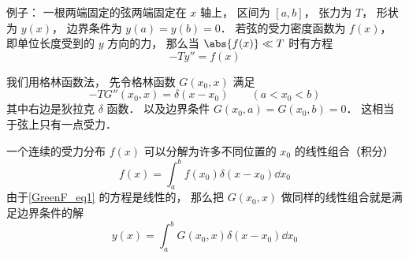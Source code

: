 
\begin{issues}
\issueDraft
\end{issues}


例子： 一根两端固定的弦两端固定在 $x$ 轴上， 区间为 $[a, b]$， 张力为 $T$， 形状为 $y(x)$， 边界条件为 $y(a) = y(b) = 0$． 若弦的受力密度函数为 $f(x)$， 即单位长度受到的 $y$ 方向的力， 那么当 $\abs{f(x)} \ll T$ 时有方程
\begin{equation}\label{GreenF_eq1}
-T y'' = f(x)
\end{equation}

我们用格林函数法， 先令格林函数 $G(x_0, x)$ 满足
\begin{equation}
-T G''(x_0, x) = \delta(x - x_0) \qquad (a < x_0 < b)
\end{equation}
其中右边是狄拉克 $\delta$ 函数． 以及边界条件 $G(x_0, a) = G(x_0, b) = 0$． 这相当于弦上只有一点受力．

一个连续的受力分布 $f(x)$ 可以分解为许多不同位置的 $x_0$ 的线性组合（积分）
\begin{equation}
f(x) = \int_a^b f(x_0) \delta(x - x_0) \dd{x_0}
\end{equation}
由于\autoref{GreenF_eq1} 的方程是线性的， 那么把 $G(x_0, x)$ 做同样的线性组合就是满足边界条件的解
\begin{equation}
y(x) = \int_a^b G(x_0, x) \delta(x - x_0) \dd{x_0}
\end{equation}

